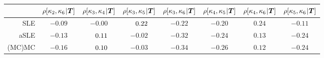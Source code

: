 \begin{table}[htbp]
\begin{tabular}{rccccccc}
    & \(\rho[\kappa_2,\kappa_6 {\:\!}|{\:\!} \bm{T}]\) & \(\rho[\kappa_3,\kappa_4 {\:\!}|{\:\!} \bm{T}]\) & \(\rho[\kappa_3,\kappa_5 {\:\!}|{\:\!} \bm{T}]\) & \(\rho[\kappa_3,\kappa_6 {\:\!}|{\:\!} \bm{T}]\)
    & \(\rho[\kappa_4,\kappa_5 {\:\!}|{\:\!} \bm{T}]\) & \(\rho[\kappa_4,\kappa_6 {\:\!}|{\:\!} \bm{T}]\) & \(\rho[\kappa_5,\kappa_6 {\:\!}|{\:\!} \bm{T}]\) \\
    \midrule
    SLE    & \(-0.09\) & \(-0.00\) & \(\hphantom{-}0.22\) & \(-0.22\) & \(-0.20\) & \(0.24\) & \(-0.11\) \\
    aSLE   & \(-0.13\) & \(\hphantom{-}0.11\) & \(-0.02\) & \(-0.32\) & \(-0.24\) & \(0.13\) & \(-0.24\) \\
    (MC)MC & \(-0.16\) & \(\hphantom{-}0.10\) & \(-0.03\) & \(-0.34\) & \(-0.26\) & \(0.12\) & \(-0.24\) \\
    \bottomrule
  \end{tabular}
\end{table}